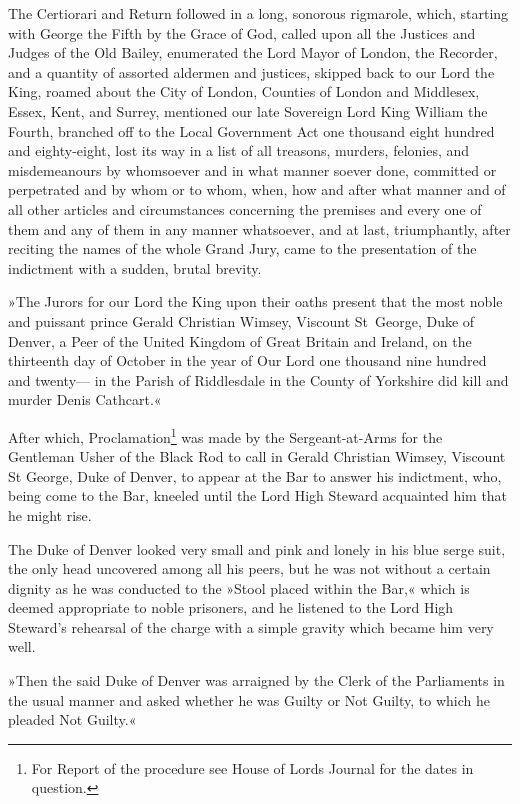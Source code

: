 The Certiorari and Return followed in a long, sonorous rigmarole, which, starting with George the Fifth by the Grace of God, called upon all the Justices and Judges of the Old Bailey, enumerated the Lord Mayor of London, the Recorder, and a quantity of assorted aldermen and justices, skipped back to our Lord the King, roamed about the City of London, Counties of London and Middlesex, Essex, Kent, and Surrey, mentioned our late Sovereign Lord King William the Fourth, branched off to the Local Government Act one thousand eight hundred and eighty-eight, lost its way in a list of all treasons, murders, felonies, and misdemeanours by whomsoever and in what manner soever done, committed or perpetrated and by whom or to whom, when, how and after what manner and of all other articles and circumstances concerning the premises and every one of them and any of them in any manner whatsoever, and at last, triumphantly, after reciting the names of the whole Grand Jury, came to the presentation of the indictment with a sudden, brutal brevity.

»The Jurors for our Lord the King upon their oaths present that the most noble and puissant prince Gerald Christian Wimsey, Viscount St~George, Duke of Denver, a Peer of the United Kingdom of Great Britain and Ireland, on the thirteenth day of October in the year of Our Lord one thousand nine hundred and twenty— in the Parish of Riddlesdale in the County of Yorkshire did kill and murder Denis Cathcart.«

After which, Proclamation\footnote{For Report of the procedure see House of Lords Journal for the dates in question.} was made by the Sergeant-at-Arms for the Gentleman Usher of the Black Rod to call in Gerald Christian Wimsey, Viscount St George, Duke of Denver, to appear at the Bar to answer his indictment, who, being come to the Bar, kneeled until the Lord High Steward acquainted him that he might rise.

The Duke of Denver looked very small and pink and lonely in his blue serge suit, the only head uncovered among all his peers, but he was not without a certain dignity as he was conducted to the »Stool placed within the Bar,« which is deemed appropriate to noble prisoners, and he listened to the Lord High Steward's rehearsal of the charge with a simple gravity which became him very well.

»Then the said Duke of Denver was arraigned by the Clerk of the Parliaments in the usual manner and asked whether he was Guilty or Not Guilty, to which he pleaded Not Guilty.«

